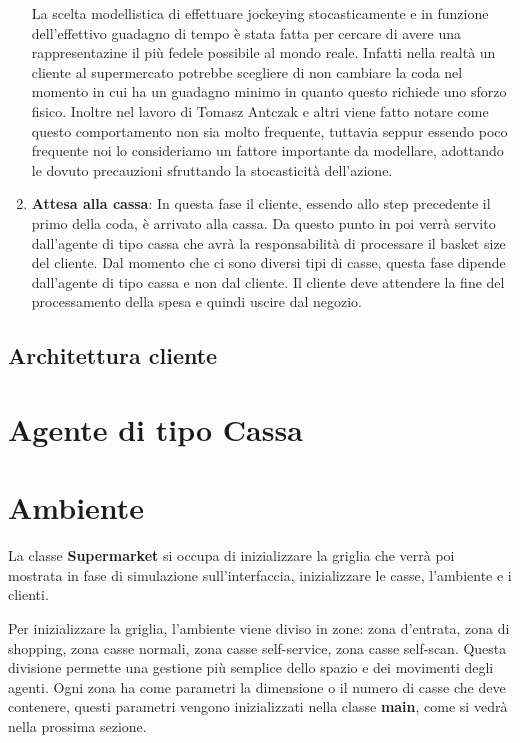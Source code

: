 \begin{enumerate}
	La scelta modellistica di effettuare jockeying stocasticamente e in funzione dell'effettivo guadagno di tempo è stata fatta per cercare di avere una rappresentazine il più fedele possibile al mondo reale. Infatti nella realtà un cliente al supermercato potrebbe scegliere di non cambiare la coda nel momento in cui ha un guadagno minimo in quanto questo richiede uno sforzo fisico. Inoltre nel lavoro di Tomasz Antczak e altri \cite{article1} viene fatto notare come questo comportamento non sia molto frequente, tuttavia seppur essendo poco frequente noi lo consideriamo un fattore importante da modellare, adottando le dovuto precauzioni sfruttando la stocasticità dell'azione.
	
	\item \textbf{Attesa alla cassa}: In questa fase il cliente, essendo allo step precedente il primo della coda, è arrivato alla cassa. Da questo punto in poi verrà servito dall'agente di tipo cassa che avrà la responsabilità di processare il basket size del cliente. Dal momento che ci sono diversi tipi di casse, questa fase dipende dall'agente di tipo cassa e non dal cliente. Il cliente deve attendere la fine del processamento della spesa e quindi uscire dal negozio.
\end{enumerate}

\subsection{Architettura cliente}


\section{Agente di tipo Cassa}


\section{Ambiente}
La classe \textbf{Supermarket} si occupa di inizializzare la griglia che verrà poi mostrata in fase di simulazione sull'interfaccia, inizializzare le casse, l'ambiente e i clienti.

Per inizializzare la griglia, l'ambiente viene diviso in zone: zona d'entrata, zona di shopping, zona casse normali, zona casse self-service, zona casse self-scan. Questa divisione permette una gestione più semplice dello spazio e dei movimenti degli agenti. Ogni zona ha come parametri la dimensione o il numero di casse che deve contenere, questi parametri vengono inizializzati nella classe \textbf{main}, come si vedrà nella prossima sezione.

